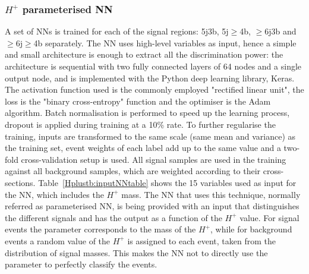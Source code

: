 \subsubsection{$H^+$ parameterised NN}

A set of NNs is trained for each of the signal regions: 5j3b, 5j$\geq$4b, $\geq$6j3b and $\geq$6j$\geq$4b separately. The NN uses high-level variables as input, hence a simple and small architecture is enough to extract all the discrimination power: the architecture is sequential with two fully connected layers of 64 nodes and a single output node, and is implemented with the Python deep learning library, Keras. The activation function used is the commonly employed "rectified linear unit", the loss is the "binary cross-entropy" function and the optimiser is the Adam algorithm. Batch normalisation is performed to speed up the learning process, dropout is applied during training at a 10\% rate. To further regularise the training, inputs are transformed to the same scale (same mean and variance) as the training set, event weights of each label add up to the same value and a two-fold cross-validation setup is used. All signal samples are used in the training against all background samples, which are weighted according to their cross-sections. Table~\ref{Hplustb:inputNNtable} shows the 15 variables used as input for the NN, which includes the $H^+$ mass. The NN that uses this technique, normally referred as parameterised NN, is being provided with an input that distinguishes the different signals and has the output as a function of the $H^+$ value. For signal events the parameter corresponds to the mass of the $H^+$, while for background events a random value of the $H^+$ is assigned to each event, taken from the distribution of signal masses. This makes the NN not to directly use the parameter to perfectly classify the events.

